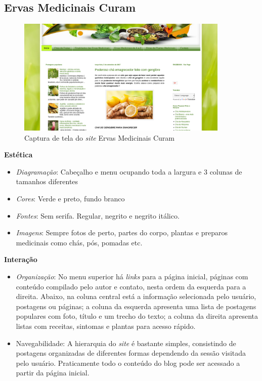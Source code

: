\subsection{Ervas Medicinais Curam}\label{ervas-medicinais-curam}

\begin{figure}
\centering
\caption{\label{fig-emcuram}Captura de tela do \emph{site} Ervas Medicinais Curam}
\includegraphics[width=0.9\textwidth]{images/similares/emcuram.png}
\end{figure}

\textbf{Estética}

\begin{itemize}
\item
  \emph{Diagramação}: Cabeçalho e menu ocupando toda a largura e 3 colunas de tamanhos diferentes
\item
  \emph{Cores}: Verde e preto, fundo branco
\item
  \emph{Fontes}: Sem serifa. Regular, negrito e negrito itálico.
\item
  \emph{Imagens}: Sempre fotos de perto, partes do corpo, plantas e preparos medicinais como chás, pós, pomadas etc.
\end{itemize}

\textbf{Interação}

\begin{itemize}
\item
  \emph{Organização}: No menu superior há \emph{links} para a página inicial, páginas com conteúdo compilado pelo autor e contato, nesta ordem da esquerda para a direita. Abaixo, na coluna central está a informação selecionada pelo usuário, postagens ou páginas; a coluna da esquerda apresenta uma lista de postagens populares com foto, título e um trecho do texto; a coluna da direita apresenta listas com receitas, sintomas e plantas para acesso rápido.
\item
  Navegabilidade: A hierarquia do \emph{site} é bastante simples, consistindo de postagens organizadas de diferentes formas dependendo da sessão visitada pelo usuário. Praticamente todo o conteúdo do blog pode ser acessado a partir da página inicial.
\end{itemize}

